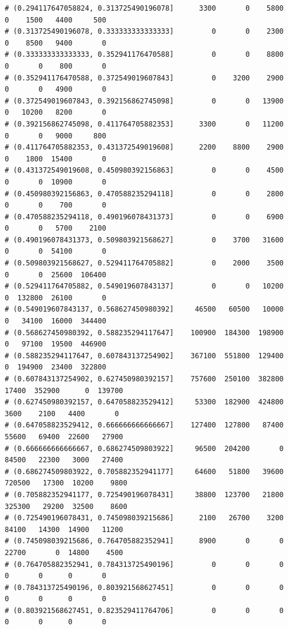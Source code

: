\documentclass{article}\usepackage[]{graphicx}\usepackage[]{color}
\makeatletter
\newenvironment{kframe}{%
 \def\at@end@of@kframe{}%
 \ifinner\ifhmode%
  \def\at@end@of@kframe{\end{minipage}}%
  \begin{minipage}{\columnwidth}%
 \fi\fi%
 \def\FrameCommand##1{\hskip\@totalleftmargin \hskip-\fboxsep
 \colorbox{shadecolor}{##1}\hskip-\fboxsep
     \hskip-\linewidth \hskip-\@totalleftmargin \hskip\columnwidth}%
 \MakeFramed {\advance\hsize-\width
   \@totalleftmargin\z@ \linewidth\hsize
   \@setminipage}}%
 {\par\unskip\endMakeFramed%
 \at@end@of@kframe}
\newenvironment{knitrout}{}{} %
\makeatother
\begin{document}
\begin{knitrout}
\begin{kframe}
\begin{verbatim}
# (0.294117647058824, 0.313725490196078]      3300       0    5800       0    1500   4400     500
# (0.313725490196078, 0.333333333333333]         0       0    2300       0    8500   9400       0
# (0.333333333333333, 0.352941176470588]         0       0    8800       0       0    800       0
# (0.352941176470588, 0.372549019607843]         0    3200    2900       0       0   4900       0
# (0.372549019607843, 0.392156862745098]         0       0   13900       0   10200   8200       0
# (0.392156862745098, 0.411764705882353]      3300       0   11200       0       0   9000     800
# (0.411764705882353, 0.431372549019608]      2200    8800    2900       0    1800  15400       0
# (0.431372549019608, 0.450980392156863]         0       0    4500       0       0  10900       0
# (0.450980392156863, 0.470588235294118]         0       0    2800       0       0    700       0
# (0.470588235294118, 0.490196078431373]         0       0    6900       0       0   5700    2100
# (0.490196078431373, 0.509803921568627]         0    3700   31600       0       0  54100       0
# (0.509803921568627, 0.529411764705882]         0    2000    3500       0       0  25600  106400
# (0.529411764705882, 0.549019607843137]         0       0   10200       0  132800  26100       0
# (0.549019607843137, 0.568627450980392]     46500   60500   10000       0   34100  16000  344400
# (0.568627450980392, 0.588235294117647]    100900  184300  198900       0   97100  19500  446900
# (0.588235294117647, 0.607843137254902]    367100  551800  129400       0  194900  23400  322800
# (0.607843137254902, 0.627450980392157]    757600  250100  382800   17400  352900      0  139700
# (0.627450980392157, 0.647058823529412]     53300  182900  424800    3600    2100   4400       0
# (0.647058823529412, 0.666666666666667]    127400  127800   87400   55600   69400  22600   27900
# (0.666666666666667, 0.686274509803922]     96500  204200       0   84500   22300   3000   27400
# (0.686274509803922, 0.705882352941177]     64600   51800   39600  720500   17300  10200    9800
# (0.705882352941177, 0.725490196078431]     38800  123700   21800  325300   29200  32500    8600
# (0.725490196078431, 0.745098039215686]      2100   26700    3200   84100   14300  14900   11200
# (0.745098039215686, 0.764705882352941]      8900       0       0   22700       0  14800    4500
# (0.764705882352941, 0.784313725490196]         0       0       0       0       0      0       0
# (0.784313725490196, 0.803921568627451]         0       0       0       0       0      0       0
# (0.803921568627451, 0.823529411764706]         0       0       0       0       0      0       0

\end{verbatim}
\end{kframe}
\end{knitrout}
\end{document}
